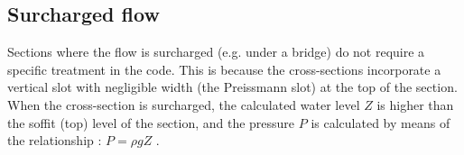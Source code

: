 \subsection{Surcharged flow}

Sections where the flow is surcharged (e.g. under a bridge) do not require a specific treatment in the code.
This is because the cross-sections incorporate a vertical slot with negligible width (the Preissmann slot) at the top of the section. When the cross-section is surcharged, the calculated water level $Z$ is higher than the soffit (top) level of the section, and the pressure $P$ is calculated by means of the relationship : $P = \rho g Z$ .


